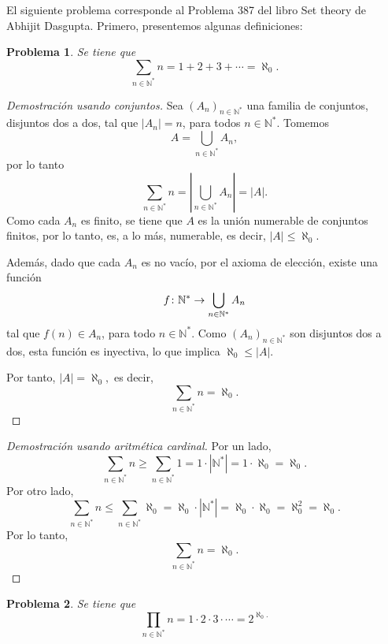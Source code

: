 \documentclass[a4,10pt]{aleph-notas}
\newtheorem*{prob}{Problema}
\begin{document}
\encabezado

\noindent
El siguiente problema corresponde al Problema 387 del libro Set theory de Abhijit Dasgupta. Primero, presentemos algunas definiciones:

\begin{prob}
    Se tiene que
        \[\sum_{n\in\mathbb{N}^*} n = 1 + 2 + 3 +\cdots =  \aleph_0.\]
\end{prob}

\begin{proof}[Demostración usando conjuntos]
    Sea $(A_n)_{n\in\mathbb{N}^*}$ una familia de conjuntos, disjuntos dos a dos, tal que \(|A_n|=n\), para todos $n\in\mathbb{N}^*$. Tomemos
    \[
        A=\bigcup_{n\in\mathbb{N}^*} A_n,
    \]
    por lo tanto
    \[
        \sum_{n\in\mathbb{N}^*} n 
        = \left|\bigcup_{n\in\mathbb{N}^*} A_n\right|
        =|A|.
    \]
    Como cada \(A_n\) es finito, se tiene que $A$ es la unión numerable de conjuntos finitos, por lo tanto, es, a lo más, numerable, es decir, \(|A|\le \aleph_0\). 
    
    Además, dado que cada \(A_n\) es no vacío, por el axioma de elección, existe una función
    \[
        f\colon \mathbb{N}^* \rightarrow \bigcup_{n\in\mathbb{N}^*} A_n
    \]
    tal que $f(n)\in A_n$, para todo $n\in \mathbb{N}^*$. Como $(A_n)_{n\in\mathbb{N}^*}$ son disjuntos dos a dos, esta función es inyectiva, lo que implica \(\aleph_0\le |A|\). 
    
    Por tanto,
    \(
        |A|=\aleph_0,
    \)
    es decir,
    \[
        \sum_{n\in\mathbb{N}^*} n = \aleph_0.
    \]
\end{proof}


\begin{proof}[Demostración usando aritmética cardinal]
    Por un lado,
    \[
        \sum_{n\in\mathbb{N}^*} n 
        \geq \sum_{n\in\mathbb{N}^*} 1
        = 1\cdot |\mathbb{N}^*|
        = 1\cdot \aleph_0
        = \aleph_0.
    \]
    Por otro lado,
    \[
        \sum_{n\in\mathbb{N}^*} n 
        \leq \sum_{n\in\mathbb{N}^*} \aleph_0
        = \aleph_0\cdot |\mathbb{N}^*|
        = \aleph_0\cdot \aleph_0
        = \aleph_0^2
        = \aleph_0.
    \]
    Por lo tanto,
    \[
        \sum_{n\in\mathbb{N}^*} n = \aleph_0.
    \]
\end{proof}

\begin{prob}
    Se tiene que
        \[\prod_{n\in\mathbb{N}^*} n = 1 \cdot 2 \cdot 3 \cdot\cdots =  2^{\aleph_0.}\]
\end{prob}
\end{document}
